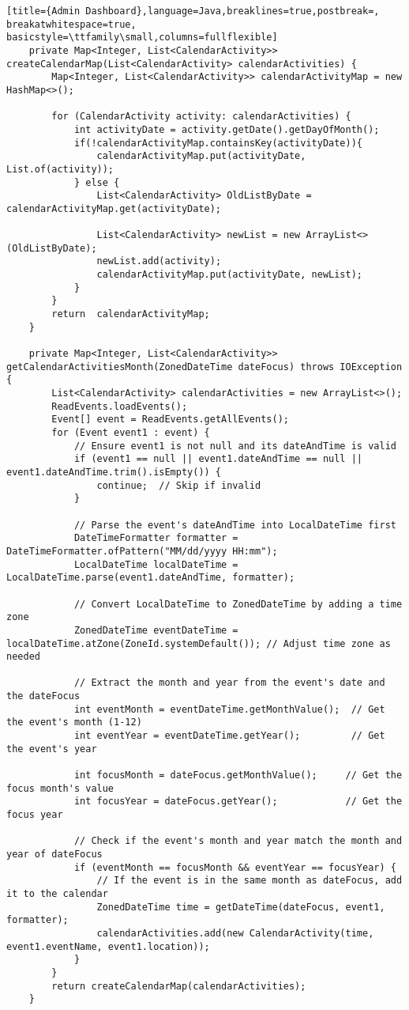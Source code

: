 \begin{lstlisting}[title={Admin Dashboard},language=Java,breaklines=true,postbreak=, breakatwhitespace=true, basicstyle=\ttfamily\small,columns=fullflexible]
    private Map<Integer, List<CalendarActivity>> createCalendarMap(List<CalendarActivity> calendarActivities) {
        Map<Integer, List<CalendarActivity>> calendarActivityMap = new HashMap<>();

        for (CalendarActivity activity: calendarActivities) {
            int activityDate = activity.getDate().getDayOfMonth();
            if(!calendarActivityMap.containsKey(activityDate)){
                calendarActivityMap.put(activityDate, List.of(activity));
            } else {
                List<CalendarActivity> OldListByDate = calendarActivityMap.get(activityDate);

                List<CalendarActivity> newList = new ArrayList<>(OldListByDate);
                newList.add(activity);
                calendarActivityMap.put(activityDate, newList);
            }
        }
        return  calendarActivityMap;
    }

    private Map<Integer, List<CalendarActivity>> getCalendarActivitiesMonth(ZonedDateTime dateFocus) throws IOException {
        List<CalendarActivity> calendarActivities = new ArrayList<>();
        ReadEvents.loadEvents();
        Event[] event = ReadEvents.getAllEvents();
        for (Event event1 : event) {
            // Ensure event1 is not null and its dateAndTime is valid
            if (event1 == null || event1.dateAndTime == null || event1.dateAndTime.trim().isEmpty()) {
                continue;  // Skip if invalid
            }

            // Parse the event's dateAndTime into LocalDateTime first
            DateTimeFormatter formatter = DateTimeFormatter.ofPattern("MM/dd/yyyy HH:mm");
            LocalDateTime localDateTime = LocalDateTime.parse(event1.dateAndTime, formatter);

            // Convert LocalDateTime to ZonedDateTime by adding a time zone
            ZonedDateTime eventDateTime = localDateTime.atZone(ZoneId.systemDefault()); // Adjust time zone as needed

            // Extract the month and year from the event's date and the dateFocus
            int eventMonth = eventDateTime.getMonthValue();  // Get the event's month (1-12)
            int eventYear = eventDateTime.getYear();         // Get the event's year

            int focusMonth = dateFocus.getMonthValue();     // Get the focus month's value
            int focusYear = dateFocus.getYear();            // Get the focus year

            // Check if the event's month and year match the month and year of dateFocus
            if (eventMonth == focusMonth && eventYear == focusYear) {
                // If the event is in the same month as dateFocus, add it to the calendar
                ZonedDateTime time = getDateTime(dateFocus, event1, formatter);
                calendarActivities.add(new CalendarActivity(time, event1.eventName, event1.location));
            }
        }
        return createCalendarMap(calendarActivities);
    }


\end{lstlisting}
